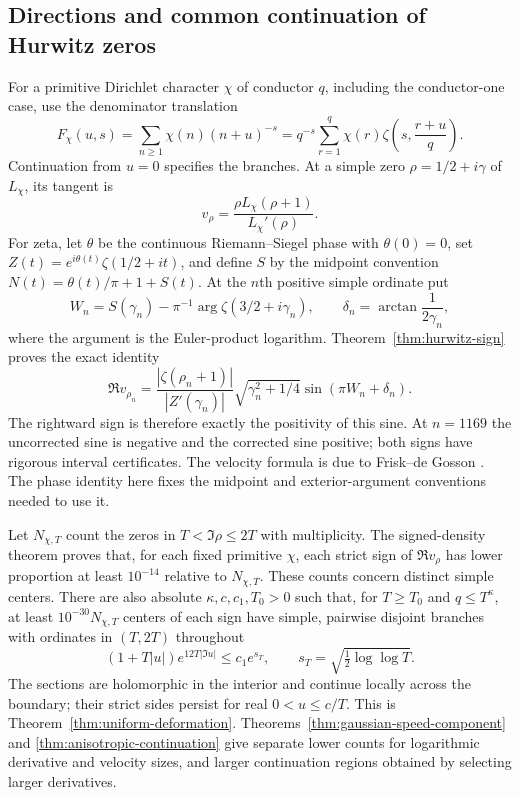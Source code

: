 \subsection{Directions and common continuation of Hurwitz zeros}
For a primitive Dirichlet character $\chi$ of conductor $q$, including
the conductor-one case, use the denominator translation
\[
 F_\chi(u,s)=\sum_{n\ge1}\chi(n)(n+u)^{-s}
   =q^{-s}\sum_{r=1}^q\chi(r)\zeta\left(s,\frac{r+u}{q}\right).
\]
Continuation from $u=0$ specifies the branches. At a simple zero
$\rho=1/2+i\gamma$ of $L_\chi$, its tangent is
\[
                  v_\rho=\frac{\rho L_\chi(\rho+1)}{L_\chi'(\rho)}.
\]
For zeta, let $\theta$ be the continuous Riemann--Siegel phase with
$\theta(0)=0$, set $Z(t)=e^{i\theta(t)}\zeta(1/2+it)$, and define
$S$ by the midpoint convention $N(t)=\theta(t)/\pi+1+S(t)$.
At the $n$th positive simple ordinate put
\[
 W_n=S(\gamma_n)-\pi^{-1}\arg\zeta(3/2+i\gamma_n),\qquad
 \delta_n=\arctan\frac1{2\gamma_n},
\]
where the argument is the Euler-product logarithm.
Theorem~\ref{thm:hurwitz-sign} proves the exact identity
\[
 \Re v_{\rho_n}
 =\frac{|\zeta(\rho_n+1)|}{|Z'(\gamma_n)|}
      \sqrt{\gamma_n^2+1/4}\sin(\pi W_n+\delta_n).
\]
The rightward sign is therefore exactly the positivity of this sine.
At $n=1169$ the uncorrected sine is negative and the corrected sine
positive; both signs have rigorous interval certificates.
The velocity formula is due to Frisk--de Gosson
\cite[Section~2, equation~(3), p.~2]{frisk-degosson}.
The phase identity here fixes the midpoint and exterior-argument
conventions needed to use it.

Let $N_{\chi,T}$ count the zeros in $T<\Im\rho\le2T$ with
multiplicity. The signed-density theorem proves that, for each fixed
primitive $\chi$, each strict sign of $\Re v_\rho$ has lower
proportion at least $10^{-14}$ relative to $N_{\chi,T}$.
These counts concern distinct simple centers.
There are also absolute $\kappa,c,c_1,T_0>0$ such that, for
$T\ge T_0$ and $q\le T^\kappa$, at least
$10^{-30}N_{\chi,T}$ centers of each sign have simple, pairwise
disjoint branches with ordinates in $(T,2T)$ throughout
\[
 (1+T|u|)e^{12T|\Im u|}\le c_1e^{s_T},
                  \qquad s_T=\sqrt{\tfrac12\log\log T}.
\]
The sections are holomorphic in the interior and continue locally
across the boundary; their strict sides persist for real
$0<u\le c/T$. This is Theorem~\ref{thm:uniform-deformation}.
Theorems~\ref{thm:gaussian-speed-component} and
\ref{thm:anisotropic-continuation} give separate lower counts for
logarithmic derivative and velocity sizes, and larger continuation
regions obtained by selecting larger derivatives.

